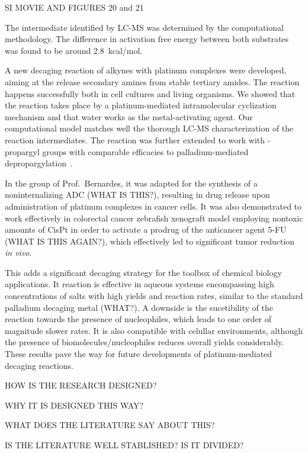 SI MOVIE AND FIGURES 20 and 21

The intermediate  identified by LC-MS was determined by the computational
methodology.
The difference in activation free energy between both substrates was found to
be around 2.8~kcal/mol.





A new decaging reaction of alkynes with platinum complexes were developed,
aiming at the release secondary amines from stable tertiary amides.
The reaction happens successfully both in cell cultures and living organisms.
We showed that the reaction takes place by a platinum-mediated intramolecular
cyclization mechanism and that water works as the metal-activating agent.
Our computational model matches well the thorough LC-MS characterization of the
reaction intermediates.
The reaction was further extended to work with -propargyl groups with
comparable efficacies to palladium-mediated depropargylation~\cite{Coelho2019}.

In the group of Prof.~Bernardes, it was adapted for the synthesis of a
noninternalizing ADC (WHAT IS THIS?), resulting in drug release upon
administration of platinum complexes in cancer cells.
It was also demonstrated to work effectively in colorectal cancer zebrafish
xenograft model employing nontoxic amounts of CisPt in order to activate a
prodrug of the anticancer agent 5-FU (WHAT IS THIS AGAIN?), which effectively
led to significant tumor reduction \emph{in vivo}.

This adds a significant decaging strategy for the toolbox of chemical biology
applications.
It reaction is effective in aqueous systems encompassing high concentrations of
salts with high yields and reaction rates, similar to the standard palladium
decaging metal (WHAT?).
A downside is the sucetibility of the reaction towards the presence of
nucleophiles, which leads to one order of magnitude slower rates.
It is also compatible with celullar environments, although the presence of
biomolecules/nucleophiles reduces overall yields considerably.
These results pave the way for future developments of platinum-mediated
decaging reactions.




HOW IS THE RESEARCH DESIGNED?\@

WHY IT IS DESIGNED THIS WAY?\@




WHAT DOES THE LITERATURE SAY ABOUT THIS?\@

IS THE LITERATURE WELL STABLISHED?\@
IS IT DIVIDED?\@

